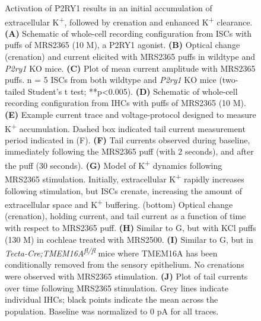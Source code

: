 \documentclass[9pt,lineno]{elife}
\begin{document}
\addtocounter{figure}{-1}
\begin{figure} [t!]
\begin{fullwidth}
  \caption{Activation of P2RY1 results in an initial accumulation of extracellular K\textsuperscript{+}, followed by crenation and enhanced K\textsuperscript{+} clearance.
\textbf{(A)} Schematic of whole-cell recording configuration from ISCs with puffs of MRS2365 (10 \textmu M), a P2RY1 agonist.
\textbf{(B)} Optical change (crenation) and current elicited with MRS2365 puffs in wildtype and \textit{P2ry1} KO mice.
\textbf{(C)} Plot of mean current amplitude with MRS2365 puffs. n = 5 ISCs from both wildtype and \textit{P2ry1} KO mice (two-tailed Student’s t test; **p<0.005).
\textbf{(D)} Schematic of whole-cell recording configuration from IHCs with puffs of MRS2365 (10 \textmu M).
\textbf{(E)} Example current trace and voltage-protocol designed to measure K\textsuperscript{+} accumulation. Dashed box indicated tail current measurement period indicated in (F).
\textbf{(F)} Tail currents observed during baseline, immediately following the MRS2365 puff (with 2 seconds), and after the puff (30 seconds).
\textbf{(G)} Model of K\textsuperscript{+} dynamics following MRS2365 stimulation. Initially, extracellular K\textsuperscript{+} rapidly increases following stimulation, but ISCs crenate, increasing the amount of extracellular space and K\textsuperscript{+} buffering. (bottom) Optical change (crenation), holding current, and tail current as a function of time with respect to MRS2365 puff.
\textbf{(H)} Similar to G, but with KCl puffs (130 \textmu M) in cochleae treated with MRS2500.
\textbf{(I)} Similar to G, but in \textit{Tecta-Cre;TMEM16A\textsuperscript{fl/fl}} mice where TMEM16A has been conditionally removed from the sensory epithelium. No crenations were observed with MRS2365 stimulation.
\textbf{(J)} Plot of tail currents over time following MRS2365 stimulation. Grey lines indicate individual IHCs; black points indicate the mean across the population. Baseline was normalized to 0 pA for all traces. 
}
\end{fullwidth}
\end{figure}
\end{document}
